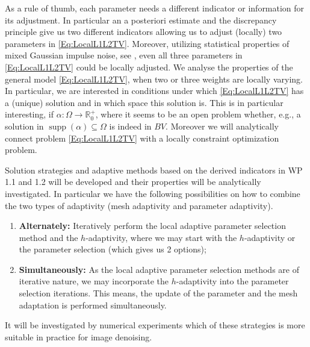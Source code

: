 \documentclass[enabledeprecatedfontcommands,cleardoublepage=empty,headsepline,twoside,11pt,DIV=15,BCOR=12mm,final]{scrartcl}
\newcommand{\R}{{\mathbb R}}
\begin{document}
As a rule of thumb, each parameter needs a different indicator or information for its adjustment. In particular an a posteriori estimate and the discrepancy principle give us two different indicators allowing us to adjust (locally) two parameters in \eqref{Eq:LocalL1L2TV}. Moreover, utilizing statistical properties of mixed Gaussian impulse noise, see , even all three parameters in \eqref{Eq:LocalL1L2TV} could be locally adjusted. We analyse the properties of the general model \eqref{Eq:LocalL1L2TV}, when two or three weights are locally varying. In particular, we are interested in conditions under which \eqref{Eq:LocalL1L2TV} has a (unique) solution and in which space this solution is. This is in particular interesting, if $\alpha:\Omega \to \R^+_0$, where it seems to be an open problem whether, e.g., a solution in $\operatorname{supp}(\alpha) \subseteq \Omega$ is indeed in $BV$. Moreover we will analytically connect problem \eqref{Eq:LocalL1L2TV} with a locally constraint optimization problem. 

Solution strategies and adaptive methods based on the derived indicators in WP 1.1 and 1.2 will be developed and their properties will be analytically investigated. In particular we have the following possibilities on how to combine the two types of adaptivity (mesh adaptivity and parameter adaptivity). 
\begin{enumerate}
\item \textbf{Alternately:} Iteratively perform the local adaptive parameter selection method  and the $h$-adaptivity, where we may start with the $h$-adaptivity or the parameter selection (which gives us 2 options);
\item \textbf{Simultaneously:} As the local adaptive parameter selection methods are of iterative nature, we may incorporate the $h$-adaptivity into the parameter selection iterations. This means, the update of the parameter and the mesh adaptation is performed simultaneously. %

\end{enumerate}
It will be investigated by numerical experiments which of these strategies is more suitable in practice for image denoising.
\end{document}
